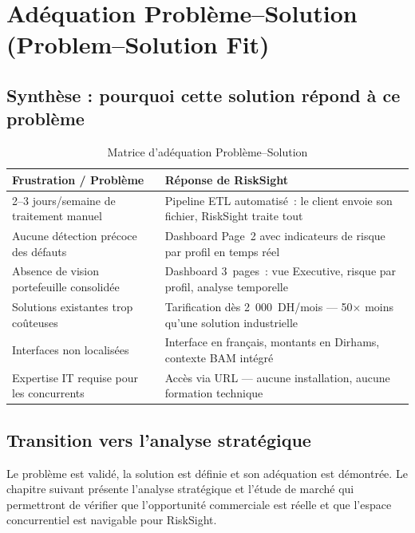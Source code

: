 \documentclass[12pt, a4paper]{report}
\begin{document}
\section{Adéquation Problème--Solution (Problem--Solution Fit)}

\subsection{Synthèse : pourquoi cette solution répond à ce problème}

\begin{table}[H]
\centering
\caption{Matrice d'adéquation Problème--Solution}
\label{tab:psf}
\renewcommand{\arraystretch}{1.4}
\begin{tabularx}{\textwidth}{p{6cm} X}
\toprule
\rowcolor{primary!12}
Frustration / Problème & Réponse de RiskSight \\
\midrule
2--3 jours/semaine de traitement manuel & Pipeline ETL automatisé~: le client envoie son fichier, RiskSight traite tout \\
Aucune détection précoce des défauts & Dashboard Page~2 avec indicateurs de risque par profil en temps réel \\
Absence de vision portefeuille consolidée & Dashboard 3~pages~: vue Executive, risque par profil, analyse temporelle \\
Solutions existantes trop coûteuses & Tarification dès 2~000~DH/mois --- 50$\times$ moins qu'une solution industrielle \\
Interfaces non localisées & Interface en français, montants en Dirhams, contexte BAM intégré \\
Expertise IT requise pour les concurrents & Accès via URL --- aucune installation, aucune formation technique \\
\bottomrule
\end{tabularx}
\end{table}

\subsection{Transition vers l'analyse stratégique}

Le problème est validé, la solution est définie et son adéquation est démontrée.
Le chapitre suivant présente l'analyse stratégique et l'étude de marché qui
permettront de vérifier que l'opportunité commerciale est réelle et que l'espace
concurrentiel est navigable pour RiskSight.
\end{document}
